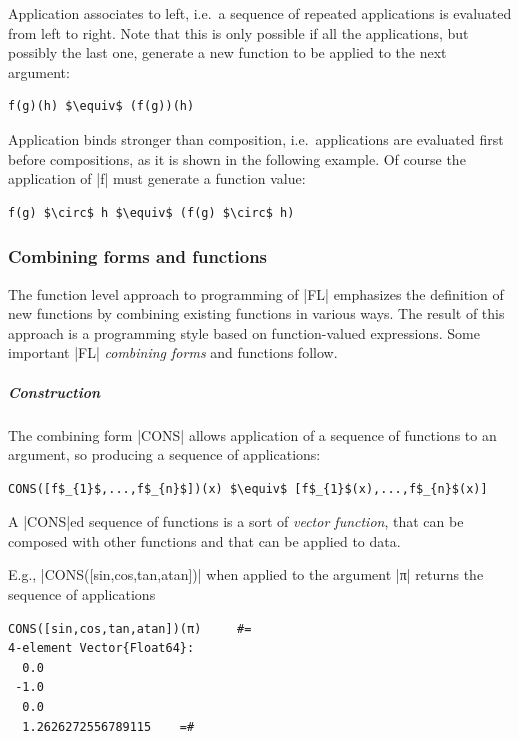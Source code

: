  Application associates to left, i.e.~a sequence of repeated 
applications is evaluated from left to right. Note that this is only 
possible if all the applications, but possibly the last one, generate a 
new function to be applied to the next argument:
\begin{lstlisting}[language=JuliaLocal, style=julia, mathescape = true]
f(g)(h) $\equiv$ (f(g))(h)
\end{lstlisting}

 Application binds stronger than composition, i.e.~applications 
are evaluated first before compositions, as it is shown in the 
following example.  Of course the application of |f| must generate a function value:
\begin{lstlisting}[language=JuliaLocal, style=julia, mathescape = true]
f(g) $\circ$ h $\equiv$ (f(g) $\circ$ h)
\end{lstlisting}


\subsubsection*{Combining forms and functions}
\label{subsec:2:forms}

The function level approach to programming of |FL| emphasizes the
definition of new functions by combining existing functions in various
ways.  The result of this approach is a programming style based on
function-valued expressions.  Some important |FL| \emph{combining
forms} and functions follow.

\subparagraph{Construction}

The combining form |CONS| allows application of a sequence
of functions to an argument, so producing a sequence of applications:  
\begin{lstlisting}[language=JuliaLocal, style=julia, mathescape = true]
CONS([f$_{1}$,...,f$_{n}$])(x) $\equiv$ [f$_{1}$(x),...,f$_{n}$(x)]
\end{lstlisting}
A |CONS|ed sequence of functions is a sort of \emph{vector function},
that can be composed with other functions and that can be applied to
data.  

E.g., |CONS([sin,cos,tan,atan])| when applied
to the argument |π| returns the sequence of applications
\begin{lstlisting}[language=JuliaLocal, style=julia, mathescape = true]
CONS([sin,cos,tan,atan])(π) 	#=
4-element Vector{Float64}:
  0.0
 -1.0
  0.0
  1.2626272556789115 	=#
\end{lstlisting}

